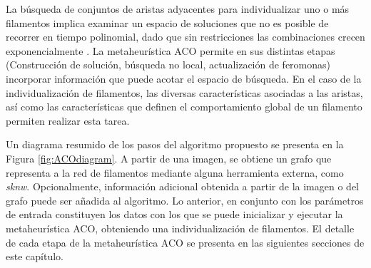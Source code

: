 La b\'usqueda de conjuntos de aristas adyacentes para individualizar uno o m\'as filamentos implica examinar un espacio de soluciones que no es posible de recorrer en tiempo polinomial, dado que sin restricciones las combinaciones crecen exponencialmente . La metaheur\'istica ACO permite en sus distintas etapas (Construcci\'on de soluci\'on, b\'usqueda no local, actualizaci\'on de feromonas) incorporar informaci\'on que puede acotar el espacio de b\'usqueda. En el caso de la individualizaci\'on de filamentos, las diversas caracter\'isticas asociadas a las aristas, as\'i como las caracter\'isticas que definen el comportamiento global de un filamento permiten realizar esta tarea. 

Un diagrama resumido de los pasos del algoritmo propuesto se presenta en la Figura \ref{fig:ACOdiagram}. A partir de una imagen, se obtiene un grafo que representa a la red de filamentos mediante alguna herramienta externa, como {\it sknw}. Opcionalmente, información adicional obtenida a partir de la imagen o del grafo puede ser añadida al algoritmo. Lo anterior, en conjunto con los par\'ametros de entrada constituyen los datos con los que se puede inicializar y ejecutar la metaheur\'istica ACO, obteniendo una individualizaci\'on de filamentos. El detalle de cada etapa de la metaheur\'istica ACO se presenta en las siguientes secciones de este cap\'itulo. 


